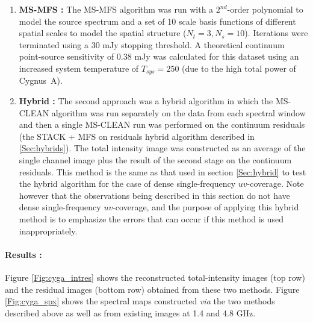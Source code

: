 \documentclass[structabstract]{stylefiles/aa}
\begin{document}
\begin{enumerate}
\item {\bf MS-MFS : }
The MS-MFS algorithm was run with a $2^{nd}$-order polynomial to model the source
spectrum and a set of 10 scale basis functions of different spatial scales
to model the spatial structure ($N_t=3, N_s=10$).
Iterations were terminated
using a 30 mJy stopping threshold. A theoretical continuum point-source 
sensitivity of 0.38 mJy was 
calculated for this dataset using an increased system temperature of $T_{sys}=250$
(due to the high total power of Cygnus~A).

\item {\bf Hybrid : }
The second approach was a hybrid algorithm
in which the MS-CLEAN algorithm was run separately on the data from each 
spectral window and then a single MS-CLEAN run was performed on the continuum
residuals (the STACK + MFS on residuals hybrid algorithm described in 
\ref{Sec:hybrids}). The total intensity image was constructed as an average of the
single channel image plus the result of the second stage on the continuum residuals.
This method is the same as that used in section \ref{Sec:hybrid} to test
the hybrid algorithm for the case of dense single-frequency $uv$-coverage. Note however
that the observations being described in this section do not have dense single-frequency
$uv$-coverage, and the purpose of applying this hybrid method is to emphasize the
errors that can occur if this method is used inappropriately.
\end{enumerate}

\paragraph{Results : }

Figure \ref{Fig:cyga_intres} shows the reconstructed total-intensity images (top row)
and  the residual images (bottom row) obtained from these two methods. 
Figure \ref{Fig:cyga_spx} shows the spectral maps constructed 
{\it via} the two methods described above as well as from existing images at 
1.4 and 4.8 GHz.
\end{document}
